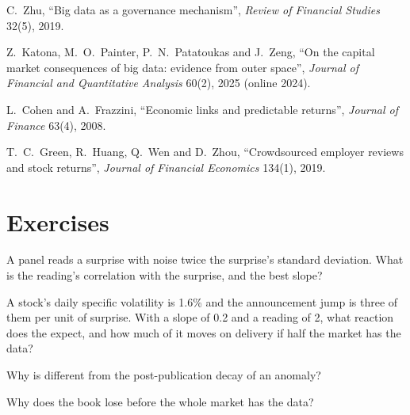 \begin{omsources}
\item C.~Zhu, ``Big data as a governance mechanism'', \emph{Review of Financial Studies} 32(5), 2019.
\item Z.~Katona, M.~O.~Painter, P.~N.~Patatoukas and J.~Zeng, ``On the capital market consequences of big data: evidence from outer space'', \emph{Journal
of Financial and Quantitative Analysis} 60(2), 2025 (online 2024).
\item L.~Cohen and A.~Frazzini, ``Economic links and predictable returns'', \emph{Journal of Finance} 63(4), 2008.
\item T.~C.~Green, R.~Huang, Q.~Wen and D.~Zhou, ``Crowdsourced employer reviews and stock returns'', \emph{Journal of Financial Economics} 134(1), 2019.
\end{omsources}

\section{Exercises}

\begin{exercise}[$\star$]\label{exo:s1:alternative-data-strategies:1}
A panel reads a surprise with noise twice the surprise's standard deviation. What is the reading's correlation with the surprise, and the best  slope?
\end{exercise}

\begin{exercise}[$\star$]\label{exo:s1:alternative-data-strategies:2}
A stock's daily specific volatility is 1.6\% and the announcement jump is three of them per unit of surprise. With a  slope of 0.2 and a reading of 2,
what reaction does the  expect, and how much of it moves on delivery if half the market has the data?
\end{exercise}

\begin{exercise}[$\star$]\label{exo:s1:alternative-data-strategies:3}
Why is  different from the post-publication decay of an anomaly?
\end{exercise}

\begin{exercise}[$\star\star$]\label{exo:s1:alternative-data-strategies:4}
Why does the book lose before the whole market has the data?
\end{exercise}

